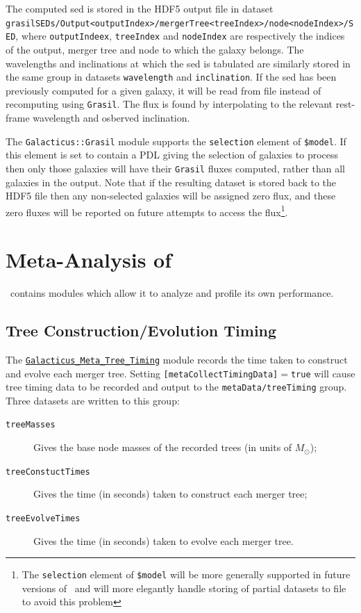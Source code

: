 The computed \gls{sed} is stored in the HDF5 output file in dataset {\tt grasilSEDs/Output\textless outputIndex\textgreater/mergerTree\textless treeIndex\textgreater/node\textless nodeIndex\textgreater/SED}, where {\tt outputIndeex}, {\tt treeIndex} and {\tt nodeIndex} are respectively the indices of the output, merger tree and node to which the galaxy belongs. The wavelengths and inclinations at which the \gls{sed} is tabulated are similarly stored in the same group in datasets {\tt wavelength} and {\tt inclination}. If the \gls{sed} has been previously computed for a given galaxy, it will be read from file instead of recomputing using {\tt Grasil}. The flux is found by interpolating to the relevant rest-frame wavelength and osberved inclination.

The {\tt Galacticus::Grasil} module supports the {\tt selection} element of {\tt \$model}. If this element is set to contain a PDL giving the selection of galaxies to process then only those galaxies will have their {\tt Grasil} fluxes computed, rather than all galaxies in the output. Note that if the resulting dataset is stored back to the HDF5 file then any non-selected galaxies will be assigned zero flux, and these zero fluxes will be reported on future attempts to access the flux\footnote{The {\tt selection} element of {\tt \$model} will be more generally supported in future versions of \protect\glc\ and will more elegantly handle storing of partial datasets to file to avoid this problem}.

\section{Meta-Analysis of \glc}

\glc\ contains modules which allow it to analyze and profile its own performance.

\subsection{Tree Construction/Evolution Timing}\label{sec:MetaTreeTimingProfiler}

The \hyperlink{galacticus.meta.tree_timing.F90:galacticus_meta_tree_timing}{{\tt Galacticus\_Meta\_Tree\_Timing}} module records the time taken to construct and evolve each merger tree. Setting {\tt [metaCollectTimingData]}$=${\tt true} will cause tree timing data to be recorded and output to the {\tt metaData/treeTiming} group. Three datasets are written to this group:
\begin{description}
 \item[{\tt treeMasses}] Gives the base node masses of the recorded trees (in units of $M_\odot$);
 \item[{\tt treeConstuctTimes}] Gives the time (in seconds) taken to construct each merger tree;
 \item[{\tt treeEvolveTimes}] Gives the time (in seconds) taken to evolve each merger tree.
\end{description}

